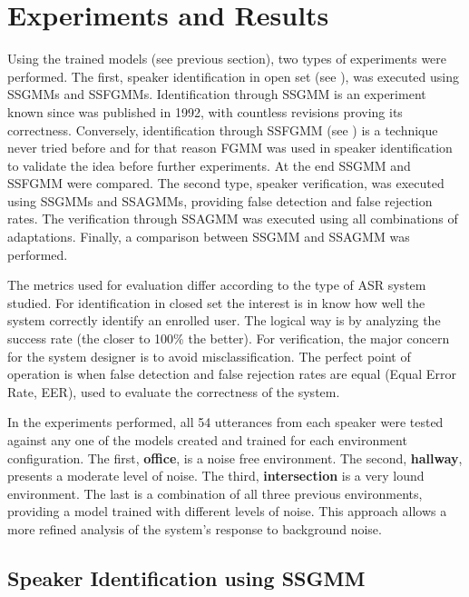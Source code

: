 \section{Experiments and Results}
\label{sec:experiments-and-results}

Using the trained models (see previous section), two types of experiments were performed. The first, speaker identification in open set (see ), was executed using SSGMMs and SSFGMMs. Identification through SSGMM is an experiment known since  was published in 1992, with countless revisions proving its correctness. Conversely, identification through SSFGMM (see ) is a technique never tried before and for that reason FGMM was used in speaker identification to validate the idea before further experiments. At the end SSGMM and SSFGMM were compared. The second type, speaker verification, was executed using SSGMMs and SSAGMMs, providing false detection and false rejection rates. The verification through SSAGMM was executed using all combinations of adaptations. Finally, a comparison between SSGMM and SSAGMM was performed.

The metrics used for evaluation differ according to the type of ASR system studied. For identification in closed set the interest is in know how well the system correctly identify an enrolled user. The logical way is by analyzing the success rate (the closer to 100\% the better). For verification, the major concern for the system designer is to avoid misclassification. The perfect point of operation is when false detection and false rejection rates are equal (Equal Error Rate, EER), used to evaluate the correctness of the system.

In the experiments performed, all 54 utterances from each speaker were tested against any one of the models created and trained for each environment configuration. The first, \textbf{office}, is a noise free environment. The second, \textbf{hallway}, presents a moderate level of noise. The third, \textbf{intersection} is a very lound environment. The last is a combination of all three previous environments, providing a model trained with different levels of noise. This approach allows a more refined analysis of the system's response to background noise.

\subsection{Speaker Identification using SSGMM}

